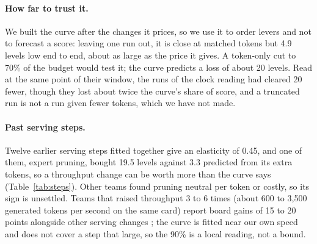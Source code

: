\paragraph{How far to trust it.}
We built the curve after the changes it prices, so we use it to order levers and not to forecast a score: leaving one run out, it is close at matched tokens but 4.9 levels low end to end, about as large as the price it gives. %
A token-only cut to 70\% of the budget would test it; the curve predicts a loss of about 20 levels. %
Read at the same point of their window, the runs of the clock reading had cleared 20 fewer, though they lost about twice the curve's share of score, and a truncated run is not a run given fewer tokens, which we have not made. %

\paragraph{Past serving steps.}
Twelve earlier serving steps fitted together give an elasticity of 0.45, and one of them, expert pruning, bought 19.5 levels against 3.3 predicted from its extra tokens, so a throughput change can be worth more than the curve says (Table~\ref{tab:steps}). Other teams found pruning neutral per token or costly, so its sign is unsettled. Teams that raised throughput 3 to 6 times (about 600 to 3,500 generated tokens per second on the same card) report board gains of 15 to 20 points alongside other serving changes \citep{zatravkin2026forum755758,pomcho2026forum756379}; the curve is fitted near our own speed and does not cover a step that large, so the 90\% is a local reading, not a bound. %
